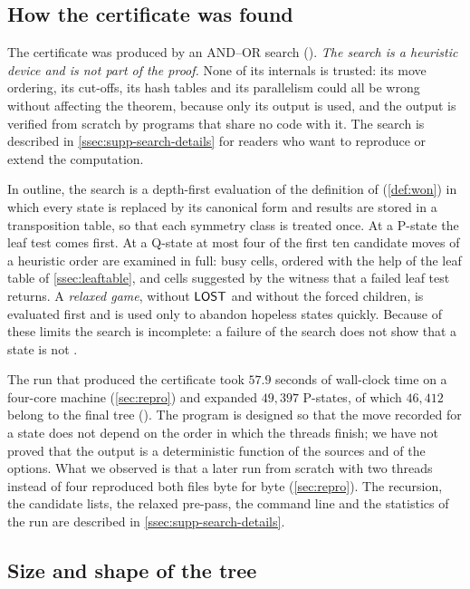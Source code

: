 \subsection{How the certificate was found}\label{ssec:search}

The certificate was produced by an AND--OR search (). \emph{The search is a heuristic
device and is not part of the proof.} None of its internals is trusted: its move ordering, its cut-offs, its
hash tables and its parallelism could all be wrong without affecting the theorem, because only its output is
used, and the output is verified from scratch by programs that share no code with it. The search is
described in \cref{ssec:supp-search-details} for readers who want to reproduce or extend the computation.

In outline, the search is a depth-first evaluation of the definition of \WON{} (\cref{def:won}) in which
every state is replaced by its canonical form and results are stored in a transposition table, so that
each symmetry class is treated once. At a P-state the leaf test comes first. At a Q-state at most four of
the first ten candidate moves of a heuristic order are examined in full: busy cells, ordered with the
help of the leaf table of \cref{ssec:leaftable}, and cells suggested by the witness that a failed leaf
test returns. A \emph{relaxed game}, without $\mathsf{LOST}$ and without the forced children, is evaluated first
and is used only to abandon hopeless states quickly. Because of these limits the search is incomplete: a
failure of the search does not show that a state is not \WON.

The run that produced the certificate took $57.9$ seconds of wall-clock time on a four-core machine
(\cref{sec:repro}) and expanded $49{,}397$ P-states, of which $46{,}412$ belong to the final tree
(). The program is designed so that the move recorded for a state does not
depend on the order in which the threads finish; we have not proved that the output is a deterministic
function of the sources and of the options. What we observed is that a later run from scratch with two
threads instead of four reproduced both files byte for byte (\cref{sec:repro}). The recursion, the
candidate lists, the relaxed pre-pass, the command line and the statistics of the run are described in
\cref{ssec:supp-search-details}.

\subsection{Size and shape of the tree}\label{ssec:shape}

